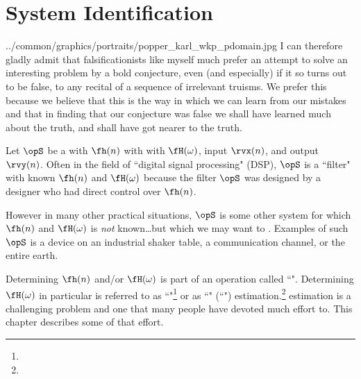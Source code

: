 \chapter{System Identification}
  {../common/graphics/portraits/popper_karl_wkp_pdomain.jpg}
  {%
  I can therefore gladly admit that falsificationists like myself much 
  prefer an attempt to solve an interesting problem by a bold conjecture, 
  even (and especially) if it so turns out to be false, 
  to any recital of a sequence of irrelevant truisms. 
  We prefer this because we believe that this is the way in which we can 
  learn from our mistakes and that in finding that our conjecture was false 
  we shall have learned much about the truth, 
  and shall have got nearer to the truth.
  }

Let $\opS$ be a  with  $\fh(n)$ with
with  $\fH(\omega)$,
input $\rvx(n)$, and output $\rvy(n)$. 
Often in the field of ``digital signal processing" (DSP), $\opS$ is a ``filter" 
with known $\fh(n)$ and $\fH(\omega)$ because the filter $\opS$ was 
designed by a designer who had direct control over $\fh(n)$.

However in many other practical situations, $\opS$ is some other system 
for which $\fh(n)$ and $\fH(\omega)$ is \emph{not} known\ldots but which we may
want to . Examples of such $\opS$ is a 
device on an industrial shaker table, a communication channel, or the entire earth.

Determining $\fh(n)$ and/or $\fH(\omega)$ is part of an operation called ``".
Determining $\fH(\omega)$ in particular is referred to as
``"\footnote{}
or as 
``" (``") estimation.\footnote{}
 estimation is a challenging problem and one that
many people have devoted much effort to. 
This chapter describes some of that effort.

